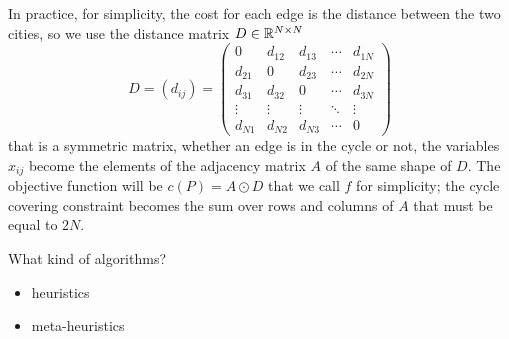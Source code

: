 In practice, for simplicity, the cost for each edge is the distance between the two cities, so we use the distance matrix $D\in\mathbb{R}^{N\times N}$
\[
D=(d_{ij})=
\begin{pmatrix} 
	0 & d_{12} & d_{13} & \cdots & d_{1N} \\
	d_{21} & 0 & d_{23} & \cdots & d_{2N} \\
	d_{31} & d_{32} & 0 & \cdots & d_{3N} \\
	\vdots & \vdots & \vdots & \ddots & \vdots \\
	d_{N1} & d_{N2} & d_{N3} & \cdots & 0
\end{pmatrix}
\]
that is a symmetric matrix, whether an edge is in the cycle or not, the variables $x_{ij}$ become the elements of the adjacency matrix $A$ of the same shape of $D$. The objective function will be $c(P)=A\odot D$ that we call $f$ for simplicity; the cycle covering constraint becomes the sum over rows and columns of $A$ that must be equal to $2N$.





What kind of algorithms?
\begin{itemize}
	\item heuristics
	\item meta-heuristics
\end{itemize}

